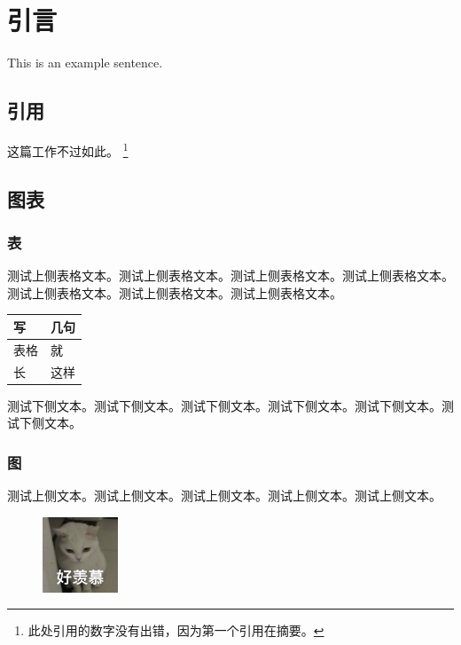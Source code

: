 
\chapter{引言}

This is an example sentence.

\section{引用}
这篇工作\cite{vaswani2017attention}不过如此。
\footnote{此处引用的数字没有出错，因为第一个引用在摘要。}

\section{图表}

\subsection{表}

测试上侧表格文本。测试上侧表格文本。测试上侧表格文本。测试上侧表格文本。测试上侧表格文本。测试上侧表格文本。测试上侧表格文本。

\begin{table}[htbp]
    \centering
    \label{tab:example}
    \begin{tabular}{ll}
    \toprule
    \textbf{写} & \textbf{几句} \\
    \midrule

    表格 & 就  \\
    
    长  & 这样 \\
    
    \bottomrule

    \end{tabular}
\end{table}

测试下侧文本。测试下侧文本。测试下侧文本。测试下侧文本。测试下侧文本。测试下侧文本。

\subsection{图}

测试上侧文本。测试上侧文本。测试上侧文本。测试上侧文本。测试上侧文本。

\begin{figure}[htb]
    \centering
        \includegraphics[width=0.2\textwidth]{image/example.jpeg}

    \label{fig:2-par_arch}
\end{figure}

